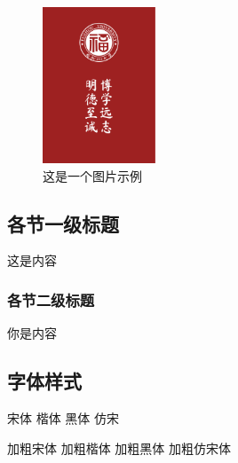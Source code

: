 \begin{figure}[H] %
    \centering
    \includegraphics[width=0.3\textwidth]{TemplateAssets/FZU-motto.pdf}
    \caption{这是一个图片示例}
    \label{fig:latex_example}
\end{figure}

\subsection{各节一级标题}

这是内容

\subsubsection{各节二级标题}
你是内容


\subsection{字体样式}

{\song 宋体 \kai 楷体 \hei 黑体 \fs 仿宋}

{\tbf 加粗宋体 \kaitib 加粗楷体 \heitib 加粗黑体 \fangsongti 加粗仿宋体}



\newpage